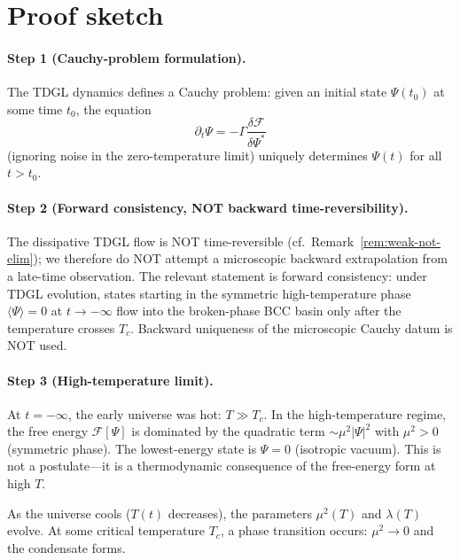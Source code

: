 \section{Proof sketch}

\paragraph{Step 1 (Cauchy-problem formulation).}
The TDGL dynamics defines a Cauchy problem: given an initial state
$\Psi(t_0)$ at some time $t_0$, the equation
\begin{equation}
\partial_t \Psi = -\Gamma \frac{\delta \mathcal{F}}{\delta \Psi^*}
\end{equation}
(ignoring noise in the zero-temperature limit) uniquely determines
$\Psi(t)$ for all $t > t_0$.

\paragraph{Step 2 (Forward consistency, NOT backward time-reversibility).}
The dissipative TDGL flow is NOT time-reversible (cf.\
Remark~\ref{rem:weak-not-elim}); we therefore do NOT attempt a
microscopic backward extrapolation from a late-time observation. The
relevant statement is forward consistency: under TDGL evolution,
states starting in the symmetric high-temperature phase
$\langle \Psi \rangle = 0$ at $t \to -\infty$ flow into the broken-phase
BCC basin only after the temperature crosses $T_c$. Backward uniqueness
of the microscopic Cauchy datum is NOT used.

\paragraph{Step 3 (High-temperature limit).}
At $t = -\infty$, the early universe was hot: $T \gg T_c$. In the
high-temperature regime, the free energy $\mathcal{F}[\Psi]$ is dominated
by the quadratic term $\sim \mu^2 |\Psi|^2$ with $\mu^2 > 0$ (symmetric phase).
The lowest-energy state is $\Psi = 0$ (isotropic vacuum). This is not a
postulate—it is a thermodynamic consequence of the free-energy form at
high $T$.

As the universe cools ($T(t)$ decreases), the parameters $\mu^2(T)$ and
$\lambda(T)$ evolve. At some critical temperature $T_c$, a phase transition
occurs: $\mu^2 \to 0$ and the condensate forms.

